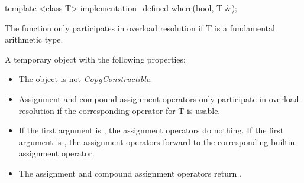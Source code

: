 \begin{itemdecl}
template <class T> implementation_defined where(bool, T &);
\end{itemdecl}
\begin{itemdescr}
  \pnum\remarks The function only participates in overload resolution if \type T is a fundamental arithmetic type.

  \pnum\returns A temporary object with the following properties:
  \begin{itemize}
    \item The object is not \textit{CopyConstructible}.
    \item Assignment and compound assignment operators only participate in overload resolution if the corresponding operator for \type T is usable.
    \item \effects If the first argument is \false, the assignment operators do nothing.
      If the first argument is \true, the assignment operators forward to the corresponding builtin assignment operator.
    \item The assignment and compound assignment operators return \void.
  \end{itemize}
\end{itemdescr}
